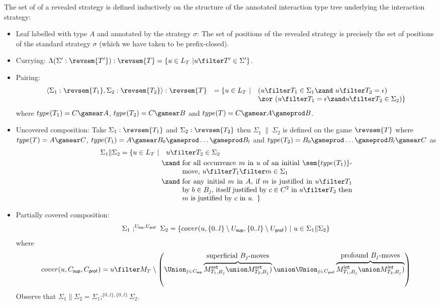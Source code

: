 \begin{definition}
\label{dfn:revealedstrat}
The set of  of a revealed strategy is defined inductively on the
structure of the annotated interaction type tree underlying the
interaction strategy:
\begin{itemize}[-]
\item Leaf labelled with type $A$ and annotated by the strategy $\sigma$: The set of positions of the revealed strategy is precisely the set of positions of the standard strategy $\sigma$ (which we have taken to be prefix-closed).

\item Currying: $\Lambda(\Sigma' : \revsem{T'}) : \revsem{T} = \{ u \in L_T \ |  u \filter T' \in \Sigma'  \}$.

\item Pairing: $$\begin{array}{lcll}
\langle \Sigma_1 : \revsem{T_1}, \Sigma_2 : \revsem{T_2} \rangle : \revsem{T} &= \{ u \in L_T \ | &
   (u \filter T_1 \in \Sigma_1 \zand\ u \filter T_2 = \epsilon) \\
&&  \zor\  ( u \filter T_1 = \epsilon \zand u \filter T_2 \in \Sigma_2) \}
\end{array}$$
where $type(T_1) = C\gamear A$, $type(T_2) = C\gamear B$
and $type(T) = C\gamear A \gameprod B$.

\item Uncovered composition: Take $\Sigma_1 : \revsem{T_1}$ and $\Sigma_2 :\revsem{T_2}$ then $\Sigma_1\ \| \ \Sigma_2$ is defined on the game $\revsem{T}$ where
$type(T) = A \gamear C$, $type(T_1) = A \gamear B_0 \gameprod
\ldots \gameprod B_l$ and $type(T_2) = B_0 \gameprod \ldots
\gameprod B_l \gamear C$ as
\begin{align*}
\Sigma_1 \| \Sigma_2 = \{ u \in L_T  \ | \
& \ \ u \filter T_2 \in \Sigma_2 \\
& \zand\ \parbox[t]{8.5cm}{for all occurrence $m$ in $u$ of an initial
                $\sem{type(T_1)}$-move, $u \filter T_1 \filter m \in \Sigma_1$} \\
& \zand\ \parbox[t]{8.5cm}{for any initial $m$ in $A$, if $m$ is justified in $u \filter T_1$ by $b\in B_j$,
itself justified by $c \in C^2$ in $u \filter T_2$ then $m$ is justified by $c$ in $u$. \} }
\end{align*}

\item Partially covered composition:
$$ \Sigma_1\ ;^{U_{\sf sup},U_{\sf prof}}\ \Sigma_2 = \{ cover(u,\{0..l\}\setminus U_{\sf sup}, \{0..l\}\setminus U_{\sf prof}) \ | \ u \in \Sigma_1 \| \Sigma_2 \}$$
where
$$cover(u,C_{\sf sup},C_{\sf prof}) = u \filter  M_T \setminus \left( \Union_{j\in
C_{\sf sup}} \overbrace{M^{\sf ext}_{T_1,B_j} \union M^{\sf ext}_{T_2,B_j})}^{\hbox{superficial $B_j$-moves}}
\union
\Union_{j\in
C_{\sf prof}} \overbrace{M^{\sf int}_{T_1,B_j} \union M^{\sf int}_{T_2,B_j})}^{\hbox{profound $B_j$-moves}} \right)$$
Observe that $\Sigma_1 \| \Sigma_2 = \Sigma_1;^{\{0..l\},\{0..l\}} \Sigma_2$.
\end{itemize}
\end{definition}


